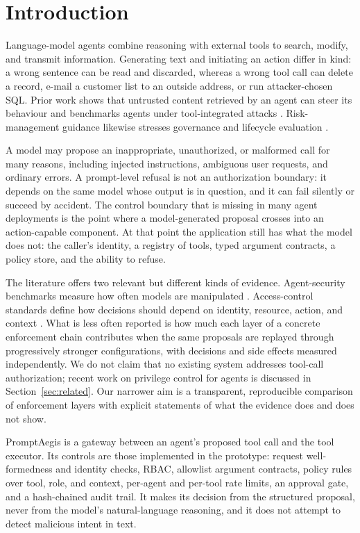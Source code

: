\documentclass[3p,twocolumn]{elsarticle}
\begin{document}
\section{Introduction}
Language-model agents combine reasoning with external tools to search, modify, and transmit information. Generating text and initiating an action differ in kind: a wrong sentence can be read and discarded, whereas a wrong tool call can delete a record, e-mail a customer list to an outside address, or run attacker-chosen SQL. Prior work shows that untrusted content retrieved by an agent can steer its behaviour \cite{perez2022,greshake2023} and benchmarks agents under tool-integrated attacks \cite{formalpi2023,bipia2023,injecagent2024,asb2024}. Risk-management guidance likewise stresses governance and lifecycle evaluation \cite{nist2023,nistgenai2024}.

A model may propose an inappropriate, unauthorized, or malformed call for many reasons, including injected instructions, ambiguous user requests, and ordinary errors. A prompt-level refusal is not an authorization boundary: it depends on the same model whose output is in question, and it can fail silently or succeed by accident. The control boundary that is missing in many agent deployments is the point where a model-generated proposal crosses into an action-capable component. At that point the application still has what the model does not: the caller's identity, a registry of tools, typed argument contracts, a policy store, and the ability to refuse.

The literature offers two relevant but different kinds of evidence. Agent-security benchmarks measure how often models are manipulated \cite{injecagent2024,asb2024}. Access-control standards define how decisions should depend on identity, resource, action, and context \cite{sandhu1996,nistabac2019,nistzt2020}. What is less often reported is how much each layer of a concrete enforcement chain contributes when the same proposals are replayed through progressively stronger configurations, with decisions and side effects measured independently. We do not claim that no existing system addresses tool-call authorization; recent work on privilege control for agents is discussed in Section~\ref{sec:related}. Our narrower aim is a transparent, reproducible comparison of enforcement layers with explicit statements of what the evidence does and does not show.

PromptAegis is a gateway between an agent's proposed tool call and the tool executor. Its controls are those implemented in the prototype: request well-formedness and identity checks, RBAC, allowlist argument contracts, policy rules over tool, role, and context, per-agent and per-tool rate limits, an approval gate, and a hash-chained audit trail. It makes its decision from the structured proposal, never from the model's natural-language reasoning, and it does not attempt to detect malicious intent in text.
\end{document}
